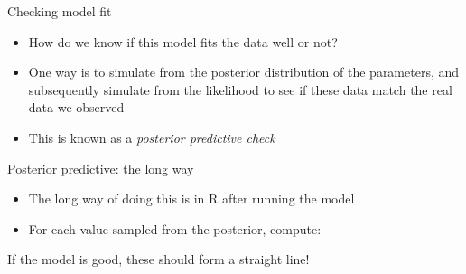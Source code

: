 \documentclass[ignorenonframetext,]{beamer}
\newenvironment{Shaded}{\begin{snugshade}}{\end{snugshade}}
\newcommand{\KeywordTok}[1]{\textcolor[rgb]{0.13,0.29,0.53}{\textbf{#1}}}
\newcommand{\DataTypeTok}[1]{\textcolor[rgb]{0.13,0.29,0.53}{#1}}
\newcommand{\DecValTok}[1]{\textcolor[rgb]{0.00,0.00,0.81}{#1}}
\newcommand{\StringTok}[1]{\textcolor[rgb]{0.31,0.60,0.02}{#1}}
\newcommand{\OperatorTok}[1]{\textcolor[rgb]{0.81,0.36,0.00}{\textbf{#1}}}
\newcommand{\NormalTok}[1]{#1}
\providecommand{\tightlist}{%
  \setlength{\itemsep}{0pt}\setlength{\parskip}{0pt}}
\begin{document}
\begin{frame}{Checking model fit}

\begin{itemize}
\tightlist
\item
  How do we know if this model fits the data well or not?
\item
  One way is to simulate from the posterior distribution of the
  parameters, and subsequently simulate from the likelihood to see if
  these data match the real data we observed
\item
  This is known as a \emph{posterior predictive check}
\end{itemize}

\end{frame}

\begin{frame}[fragile]{Posterior predictive: the long way}

\begin{itemize}
\tightlist
\item
  The long way of doing this is in R after running the model
\item
  For each value sampled from the posterior, compute:
\end{itemize}

\begin{Shaded}
\end{Shaded}

If the model is good, these should form a straight line!

\end{frame}
\end{document}

